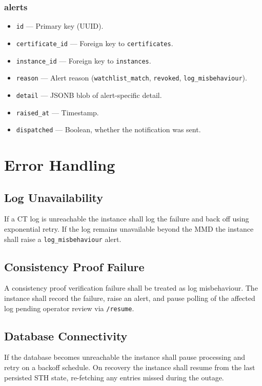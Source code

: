 \documentclass{article}
\begin{document}
\subsubsection{alerts}
\begin{itemize}
    \item \texttt{id} --- Primary key (UUID).
    \item \texttt{certificate\_id} --- Foreign key to \texttt{certificates}.
    \item \texttt{instance\_id} --- Foreign key to \texttt{instances}.
    \item \texttt{reason} --- Alert reason (\texttt{watchlist\_match},
    \texttt{revoked}, \texttt{log\_misbehaviour}).
    \item \texttt{detail} --- JSONB blob of alert-specific detail.
    \item \texttt{raised\_at} --- Timestamp.
    \item \texttt{dispatched} --- Boolean, whether the notification was sent.
\end{itemize}

\section{Error Handling}

\subsection{Log Unavailability}
If a CT log is unreachable the instance shall log the failure and back off
using exponential retry. If the log remains unavailable beyond the MMD the
instance shall raise a \texttt{log\_misbehaviour} alert.

\subsection{Consistency Proof Failure}
A consistency proof verification failure shall be treated as log
misbehaviour. The instance shall record the failure, raise an alert, and
pause polling of the affected log pending operator review via \texttt{/resume}.

\subsection{Database Connectivity}
If the database becomes unreachable the instance shall pause processing and
retry on a backoff schedule. On recovery the instance shall resume from the
last persisted STH state, re-fetching any entries missed during the outage.
\end{document}
